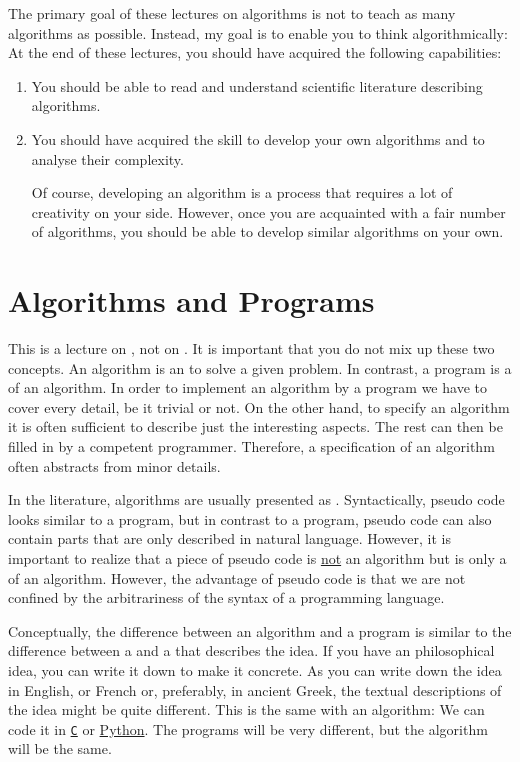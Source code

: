 The primary goal of these lectures on algorithms is not to teach as many algorithms as possible.
Instead, my goal is to enable you to think algorithmically:  At the end of these
lectures, you should have acquired the following capabilities:
\pagebreak
\begin{enumerate}
\item You should be able to read and understand scientific literature describing algorithms.
\item You should have acquired the skill to develop your own algorithms and to analyse their complexity.

      Of course, developing an algorithm is a process that requires a lot of creativity on your side.  However,
      once you are acquainted with a fair number of algorithms, you should be able to develop similar
      algorithms on your own. 
\end{enumerate}


\section{Algorithms and Programs}
This is a lecture on , not on .  It is important that you do not mix up
these two concepts.  An algorithm is an  to solve a given problem.  In
contrast, a program is a  of an algorithm.  In order to implement an
algorithm by a program we have to cover every detail, be it trivial or not.  On the other hand, 
to specify an algorithm it is often sufficient to describe just the interesting aspects.  The rest can then be
filled in by a competent programmer.  Therefore, a specification of an algorithm often abstracts from minor
details. 

In the literature, algorithms are usually presented as .  Syntactically, pseudo code looks
similar to a program, but in contrast to a program, pseudo code can also contain parts that are only
described in natural language.   However, it is important to realize that a piece of pseudo code is
\underline{not} an algorithm but is only a  of an algorithm.  However, the
advantage of pseudo code is that we are not confined by the arbitrariness of the syntax of a
programming language.

Conceptually, the difference between an algorithm and a program is similar to the difference between
a  and a  that describes the idea.  If you have an philosophical idea, you
can write it down to make it concrete.  As you can write down the idea in English, or French or, preferably, in
ancient Greek, the textual descriptions of the idea might be quite different.  This is the same with an algorithm:
We can code it in \href{https://en.wikipedia.org/wiki/C_(programming_language)}{\texttt{C}} or
\href{http://python.org}{Python}.  The programs will be very different, but the algorithm will be the same. 


